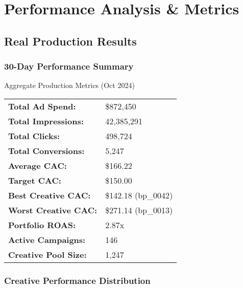 \documentclass[11pt,a4paper]{report}
\begin{document}
\chapter{Performance Analysis \& Metrics}

\section{Real Production Results}

\subsection{30-Day Performance Summary}

\begin{metricbox}{Aggregate Production Metrics (Oct 2024)}
\begin{tabular}{ll}
\textbf{Total Ad Spend:} & \$872,450 \\
\textbf{Total Impressions:} & 42,385,291 \\
\textbf{Total Clicks:} & 498,724 \\
\textbf{Total Conversions:} & 5,247 \\
\textbf{Average CAC:} & \$166.22 \\
\textbf{Target CAC:} & \$150.00 \\
\textbf{Best Creative CAC:} & \$142.18 (bp\_0042) \\
\textbf{Worst Creative CAC:} & \$271.14 (bp\_0013) \\
\textbf{Portfolio ROAS:} & 2.87x \\
\textbf{Active Campaigns:} & 146 \\
\textbf{Creative Pool Size:} & 1,247 \\
\end{tabular}
\end{metricbox}

\subsection{Creative Performance Distribution}
\end{document}
